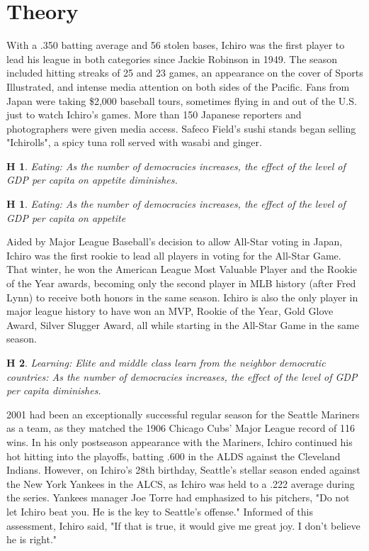 \documentclass[12pt]{article}
\theoremstyle{hypotheses}
\newtheorem{hyp}{H}
\newtheorem{subhyp}{H}
\begin{document}
\section*{Theory}
With a .350 batting average and 56 stolen bases, Ichiro was the first player to lead his league in both categories since Jackie Robinson in 1949. The season included hitting streaks of 25 and 23 games, an appearance on the cover of Sports Illustrated, and intense media attention on both sides of the Pacific. Fans from Japan were taking \$2,000 baseball tours, sometimes flying in and out of the U.S. just to watch Ichiro's games. More than 150 Japanese reporters and photographers were given media access. Safeco Field's sushi stands began selling "Ichirolls", a spicy tuna roll served with wasabi and ginger.

\bigskip
\begin{hyp}
Eating: As the number of democracies increases, the effect of the level of GDP per capita on appetite diminishes.  
\end{hyp}
\begin{subhyp}
Eating: As the number of democracies increases, the effect of the level of GDP per capita on appetite 
\end{subhyp}


Aided by Major League Baseball's decision to allow All-Star voting in Japan, Ichiro was the first rookie to lead all players in voting for the All-Star Game. That winter, he won the American League Most Valuable Player and the Rookie of the Year awards, becoming only the second player in MLB history (after Fred Lynn) to receive both honors in the same season. Ichiro is also the only player in major league history to have won an MVP, Rookie of the Year, Gold Glove Award, Silver Slugger Award, all while starting in the All-Star Game in the same season.

\bigskip
\begin{hyp}
Learning: Elite and middle class learn from the neighbor democratic countries: As the number of democracies increases, the effect of the level of GDP per capita diminishes.  
\end{hyp}

2001 had been an exceptionally successful regular season for the Seattle Mariners as a team, as they matched the 1906 Chicago Cubs' Major League record of 116 wins. In his only postseason appearance with the Mariners, Ichiro continued his hot hitting into the playoffs, batting .600 in the ALDS against the Cleveland Indians. However, on Ichiro's 28th birthday, Seattle's stellar season ended against the New York Yankees in the ALCS, as Ichiro was held to a .222 average during the series. Yankees manager Joe Torre had emphasized to his pitchers, "Do not let Ichiro beat you. He is the key to Seattle's offense." Informed of this assessment, Ichiro said, "If that is true, it would give me great joy. I don't believe he is right."
\end{document}
